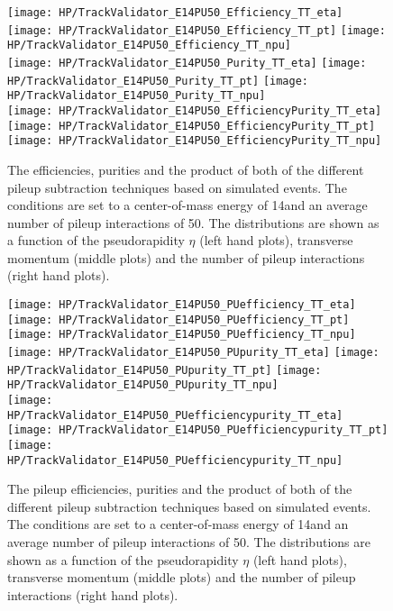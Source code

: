 \begin{figure}[!h]
  \centering
  \texttt{[image: HP/TrackValidator\_E14PU50\_Efficiency\_TT\_eta]}
  \texttt{[image: HP/TrackValidator\_E14PU50\_Efficiency\_TT\_pt]}
  \texttt{[image: HP/TrackValidator\_E14PU50\_Efficiency\_TT\_npu]}
   \\
  \texttt{[image: HP/TrackValidator\_E14PU50\_Purity\_TT\_eta]}
  \texttt{[image: HP/TrackValidator\_E14PU50\_Purity\_TT\_pt]}
  \texttt{[image: HP/TrackValidator\_E14PU50\_Purity\_TT\_npu]}
   \\
  \texttt{[image: HP/TrackValidator\_E14PU50\_EfficiencyPurity\_TT\_eta]}
  \texttt{[image: HP/TrackValidator\_E14PU50\_EfficiencyPurity\_TT\_pt]}
  \texttt{[image: HP/TrackValidator\_E14PU50\_EfficiencyPurity\_TT\_npu]}
  \caption[Efficiencies, purities and their product of the different pileup subtraction techniques based on simulated \ttbar events with 14\TeV and $\left<PU\right>=50$]{The efficiencies, purities and the product of both of the different pileup subtraction techniques based on simulated \ttbar events. The conditions are set to a center-of-mass energy of 14\TeV and an average number of pileup interactions of 50. The distributions are shown as a function of the pseudorapidity $\eta$ (left hand plots), transverse momentum (middle plots) and the number of pileup interactions (right hand plots).}
\end{figure}
\clearpage

\begin{figure}[!h]
  \centering
  \texttt{[image: HP/TrackValidator\_E14PU50\_PUefficiency\_TT\_eta]}
  \texttt{[image: HP/TrackValidator\_E14PU50\_PUefficiency\_TT\_pt]}
  \texttt{[image: HP/TrackValidator\_E14PU50\_PUefficiency\_TT\_npu]}
   \\
  \texttt{[image: HP/TrackValidator\_E14PU50\_PUpurity\_TT\_eta]}
  \texttt{[image: HP/TrackValidator\_E14PU50\_PUpurity\_TT\_pt]}
  \texttt{[image: HP/TrackValidator\_E14PU50\_PUpurity\_TT\_npu]}
   \\
  \texttt{[image: HP/TrackValidator\_E14PU50\_PUefficiencypurity\_TT\_eta]}
  \texttt{[image: HP/TrackValidator\_E14PU50\_PUefficiencypurity\_TT\_pt]}
  \texttt{[image: HP/TrackValidator\_E14PU50\_PUefficiencypurity\_TT\_npu]}
  \caption[Pileup efficiencies, purities and their product of the different pileup subtraction techniques based on simulated \ttbar events with 14\TeV and $\left<PU\right>=50$]{The pileup efficiencies, purities and the product of both of the different pileup subtraction techniques based on simulated \ttbar events. The conditions are set to a center-of-mass energy of 14\TeV and an average number of pileup interactions of 50. The distributions are shown as a function of the pseudorapidity $\eta$ (left hand plots), transverse momentum (middle plots) and the number of pileup interactions (right hand plots).}
\end{figure}
\clearpage

